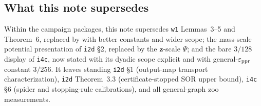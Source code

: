 \subsection*{What this note supersedes}

Within the campaign packages, this note supersedes \texttt{w1} Lemmas~3--5 and
Theorem~6, replaced by  with better
constants and wider scope; the mass-scale potential presentation of
\texttt{i2d} \S2, replaced by the $\bm{z}$-scale $\Psi$; and the bare $3/128$
display of \texttt{i4c}, now stated with its dyadic scope explicit and with
general-$\varepsilon_{\mathrm{ppr}}$ constant $3/256$. It leaves standing \texttt{i2d} \S1
(output-map transport characterization), \texttt{i2d} Theorem~3.3
(certificate-stopped SOR upper bound), \texttt{i4c} \S6 (spider and
stopping-rule calibrations), and all general-graph zoo measurements.

